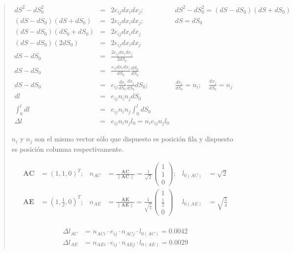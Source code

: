 \documentclass[a4paper,10pt,twoside,final,spanish]{article}
\begin{document}
\begin{quote}

\[
\begin{array}{rcll}
dS^{2}-dS_{0}^{2}          & = & 2e_{ij}dx_{i}dx_{j}; & 
dS^{2}-dS_{0}^{2}=(dS-dS_{0})(dS+dS_{0})\\
(dS-dS_{0})(dS+dS_{0})     & = & 2e_{ij}dx_{i}dx_{j}; & 
dS=dS_{0}\\
(dS-dS_{0})(dS_{0}+dS_{0}) & = & 2e_{ij}dx_{i}dx_{j} & \\
(dS-dS_{0})(2dS_{0})       & = & 2e_{ij}dx_{i}dx_{j} & \\[0.15cm]
dS-dS_{0}                  & = & \frac{2e_{ij}dx_{i}dx_{j}}{2dS_{0}} & \\[0.15cm]
dS-dS_{0}                  & = & \frac{e_{ij}dx_{i}dx_{j}}{dS_{0}} 
								 \frac{dS_{0}}{dS_{0}} & \\[0.15cm]
dS-dS_{0}                  & = & e_{ij}\frac{dx_{i}}{dS_{0}}
 									   \frac{dx_{j}}{dS_{0}}dS_{0}; & 
\frac{dx_{i}}{dS_{0}}=n_{i};\quad\frac{dx_{j}}{dS_{0}}=n_{j} \\[0.15cm] 
dl                         & = & e_{ij}n_{i}n_{j}dS_{0} & \\[0.15cm]
\int_{0}^{l}dl             & = & e_{ij}n_{i}n_{j}\int_{0}^{l}dS_{0} & \\[0.15cm]
\Delta l                   & = & e_{ij}n_{i}n_{j}l_{0}=n_{i}e_{ij}n_{j}l_{0} &
\end{array}
\]

$n_{i}$ y $n_{j}$ son el mismo vector sólo que dispuesto es posición fila y dispuesto es posición columna respectivamente.

\begin{align*}
\mathbf{AC} &= (1,1,0)^{T}; & 
n_{AC} &= \frac{\mathbf{AC}}{\|\mathbf{AC}\|} = \frac{1}{\sqrt{2}}
\begin{pmatrix}
1 \\
1 \\
0
\end{pmatrix}; &
l_{0(AC)} &= \sqrt{2}\\
\mathbf{AE} &= \left(1,\frac{1}{2},0\right)^{T}; & 
n_{AE} &= \frac{\mathbf{AE}}{\|\mathbf{AE}\|} = \frac{1}{\sqrt{\frac{5}{4}}}
\begin{pmatrix}
1           \\
\frac{1}{2} \\
0
\end{pmatrix} &
l_{0(AE)} &= \sqrt{\frac{5}{4}}\\
\end{align*}

\begin{align*}
\Delta l_{AC} &= n_{ACi}\cdot e_{ij}\cdot n_{ACj}\cdot l_{0(AC)}=0.0042 \\
\Delta l_{AE} &= n_{AEi}\cdot e_{ij}\cdot n_{AEj}\cdot l_{0(AE)}=0.0029
\end{align*}


\end{quote}
\end{document}
